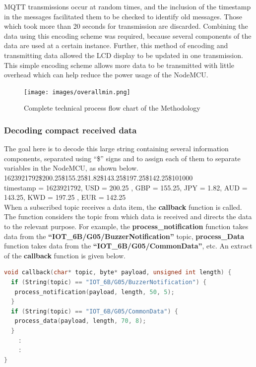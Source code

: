 MQTT transmissions occur at random times, and the inclusion of the timestamp in the messages facilitated them to be checked to identify old messages. Those which took more than 20 seconds for transmission are discarded. Combining the data using this encoding scheme was required, because several components of the data are used at a certain instance. Further, this method of encoding and transmitting data allowed the LCD display to be updated in one transmission.\\

This simple encoding scheme allows more data to be transmitted with little overhead which can help reduce the power usage of the NodeMCU.

\newpage

\begin{figure}[H]
    \centering
      \texttt{[image: images/overallmin.png]}
    \caption{Complete technical process flow chart of the Methodology}
    \label{front}
\end{figure}

\newpage

\subsubsection{Decoding compact received data}

The goal here is to decode this large string containing several information components, separated using “\$” signs and to assign each of them to separate variables in the NodeMCU, as shown below. \\


1623921792\$200.25\$155.25\$1.82\$143.25\$197.25\$142.25\$101000\\


timestamp = 1623921792, USD = 200.25 , GBP = 155.25, JPY = 1.82, AUD = 143.25, KWD = 197.25 , EUR = 142.25\\

When a subscribed topic receives a data item, the \textbf{callback} function is called. The function considers the topic from which data is received and directs the data to the relevant purpose. For example, the \textbf{process\_notification}  function takes data from the \textbf{“IOT\_6B/G05/BuzzerNotification”} topic, \textbf{process\_Data} function takes data from the \textbf{“IOT\_6B/G05/CommonData”}, etc. An extract of the \textbf{callback} function is given below.\\

\begin{lstlisting}[language=C++]
void callback(char* topic, byte* payload, unsigned int length) {
  if (String(topic) == "IOT_6B/G05/BuzzerNotification") {
   process_notification(payload, length, 50, 5);
  }
  if (String(topic) == "IOT_6B/G05/CommonData") {
   process_data(payload, length, 70, 8);
  }
	:
	:
}
\end{lstlisting}

